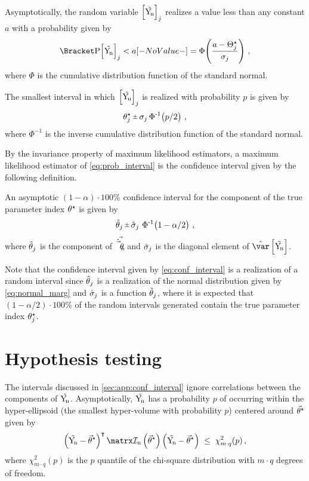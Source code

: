 \documentclass[../main.tex]{subfiles}
\begin{document}
Asymptotically, the random variable $\left[\mathrm{\vec{Y_{\!n}}}\right]_j$ realizes a value less than any constant $a$ with a probability given by
\begin{equation}
    \Prob{\left[\sampdu\right]_j < a } = \operatorname{\Phi}\!\left(\frac{a - \tparam\param_j}{\sigma_j}\right)\,,
\end{equation}
where $\Phi$ is the cumulative distribution function of the standard normal.

The smallest interval in which $\left[\mathrm{\vec{Y_{\!n}}}\right]_j$ is realized with probability $p$ is given by
\begin{equation}
\label{eq:prob_interval}
     \tparam\paramv_j \, \raisebox{.2ex}{$\scriptstyle\pm$} \, \sigma_j \operatorname{\Phi^{-1}}\!\left(p/2\right)\,,
\end{equation}
where $\Phi^{-1}$ is the inverse cumulative distribution function of the standard normal.

By the invariance property of maximum likelihood estimators, a maximum likelihood estimator of \cref{eq:prob_interval} is the confidence interval given by the following definition.
\begin{definition}
\label{def:conf_interval}
An asymptotic $(1 - \alpha) \cdot 100 \%$ confidence interval for the \jth component of the true parameter index ${\theta}^{\star}$ is given by
\begin{equation}
\label{eq:conf_interval}
    \estimator\paramv_j \, \raisebox{.2ex}{$\scriptstyle\pm$} \, \estimator{\sigma}_j \, \operatorname{\Phi^{-1}}\!\left(1-\alpha/2\right)\,,
\end{equation}
where $\hat{\theta}_j$ is the \jth component of $\vec{\hat{\vec{\theta}}_{n}}$ and $\hat{\sigma}_j$ is the \jth diagonal element of $\estimator{\var}\left[\sampdu\right]$.
\end{definition}
Note that the confidence interval given by \cref{eq:conf_interval} is a realization of a random interval since $\hat{\theta}_j$ is a realization of the normal distribution given by \cref{eq:normal_marg} and $\hat{\sigma}_j$ is a function $\hat{\theta}_j$, where it is expected that $(1-\alpha/2) \cdot 100 \%$ of the random intervals generated contain the true parameter index ${\theta}^{\star}_j$.

\section{Hypothesis testing}
\label{sec:app:conf_region}
The intervals discussed in \cref{sec:app:conf_interval} ignore correlations between the components of $\mathrm{\vec{Y_{\!n}}}$. Asymptotically, $\mathrm{\vec{Y_{\!n}}}$ has a probability $p$ of occurring within the hyper-ellipsoid (the smallest hyper-volume with probability $p$) centered around ${\vec{\theta}}^{\star}$ given by
\begin{equation}
\label{eq:conf_region}
    \left(\sampdu - \tparam\sysparamvec\right)^\intercal \infomatrxn\left(\tparam\sysparamvec\right)\left(\sampdu - \tparam\sysparamvec\right) \;\leq\; \chi_{m \cdot q}^{2}(p)\,,
\end{equation}
where $\chi_{m \cdot q}^2(p)$ is the $p$ quantile of the chi-square distribution with $m \cdot q$ degrees of freedom. 
\end{document}
